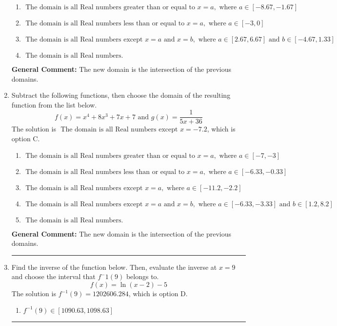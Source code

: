 \documentclass{extbook}[14pt]
\newcommand{\litem}[1]{\item #1

\rule{\textwidth}{0.4pt}}
\begin{document}
\begin{enumerate}
{\begin{enumerate}[label=\Alph*.]
\item \( \text{ The domain is all Real numbers greater than or equal to } x = a, \text{ where } a \in [-8.67, -1.67] \)


\item \( \text{ The domain is all Real numbers less than or equal to } x = a, \text{ where } a \in [-3, 0] \)


\item \( \text{ The domain is all Real numbers except } x = a \text{ and } x = b, \text{ where } a \in [2.67, 6.67] \text{ and } b \in [-4.67, 1.33] \)


\item \( \text{ The domain is all Real numbers. } \)


\end{enumerate}

\textbf{General Comment:} The new domain is the intersection of the previous domains.
}
\litem{
Subtract the following functions, then choose the domain of the resulting function from the list below.
\[ f(x) = x^{4} +8 x^{3} +7 x + 7 \text{ and } g(x) = \frac{1}{5x+36} \]The solution is \( \text{ The domain is all Real numbers except } x = -7.2 \), which is option C.\begin{enumerate}[label=\Alph*.]
\item \( \text{ The domain is all Real numbers greater than or equal to } x = a, \text{ where } a \in [-7, -3] \)


\item \( \text{ The domain is all Real numbers less than or equal to } x = a, \text{ where } a \in [-6.33, -0.33] \)


\item \( \text{ The domain is all Real numbers except } x = a, \text{ where } a \in [-11.2, -2.2] \)


\item \( \text{ The domain is all Real numbers except } x = a \text{ and } x = b, \text{ where } a \in [-6.33, -3.33] \text{ and } b \in [1.2, 8.2] \)


\item \( \text{ The domain is all Real numbers. } \)


\end{enumerate}

\textbf{General Comment:} The new domain is the intersection of the previous domains.
}
\litem{
Find the inverse of the function below. Then, evaluate the inverse at $x = 9$ and choose the interval that $f^-1(9)$ belongs to.
\[ f(x) = \ln{(x-2)}-5 \]The solution is \( f^{-1}(9) = 1202606.284 \), which is option D.\begin{enumerate}[label=\Alph*.]
\item \( f^{-1}(9) \in [1090.63, 1098.63] \)


\end{enumerate}}
\end{enumerate}
\end{document}
